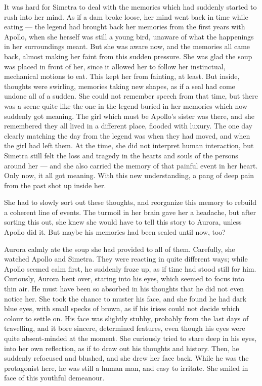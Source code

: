 \froufrou{}

It was hard for Simetra to deal with the memories which had suddenly started to rush into her mind. As if a dam broke loose, her mind went back in time while eating --- the legend had brought back her memories from the first years with Apollo, when she herself was still a young bird, unaware of what the happenings in her surroundings meant. But she was aware now, and the memories all came back, almost making her faint from this sudden pressure. She was glad the soup was placed in front of her, since it allowed her to follow her instinctual, mechanical motions to eat. This kept her from fainting, at least. But inside, thoughts were swirling, memories taking new shapes, as if a seal had come undone all of a sudden. She could not remember speech from that time, but there was a scene quite like the one in the legend buried in her memories which now suddenly got meaning. The girl which must be Apollo's sister was there, and she remembered they all lived in a different place, flooded with luxury. The one day clearly matching the day from the legend was when they had moved, and when the girl had left them. At the time, she did not interpret human interaction, but Simetra still felt the loss and tragedy in the hearts and souls of the persons around her --- and she also carried the memory of that painful event in her heart. Only now, it all got meaning. With this new understanding, a pang of deep pain from the past shot up inside her.

She had to slowly sort out these thoughts, and reorganize this memory to rebuild a coherent line of events. The turmoil in her brain gave her a headache, but after sorting this out, she knew she would have to tell this story to Aurora, unless Apollo did it. But maybe his memories had been sealed until now, too?

\froufrou{}

Aurora calmly ate the soup she had provided to all of them. Carefully, she watched Apollo and Simetra. They were reacting in quite different ways; while Apollo seemed calm first, he suddenly froze up, as if time had stood still for him. Curiously, Aurora bent over, staring into his eyes, which seemed to focus into thin air. He must have been so absorbed in his thoughts that he did not even notice her. She took the chance to muster his face, and she found he had dark blue eyes, with small specks of brown, as if his irises could not decide which colour to settle on. His face was slightly stubby, probably from the last days of travelling, and it bore sincere, determined features, even though his eyes were quite absent-minded at the moment. She curiously tried to stare deep in his eyes, into her own reflection, as if to draw out his thoughts and history. Then, he suddenly refocused and blushed, and she drew her face back. While he was the protagonist here, he was still a human man, and easy to irritate. She smiled in face of this youthful demeanour. 

